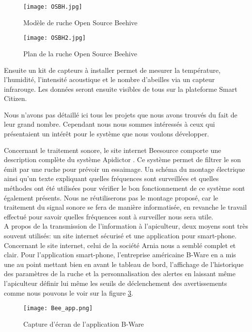 \begin{figure}[h]
\centering\texttt{[image: OSBH.jpg]}
\caption{\label{fig:OSBH} Modèle de ruche Open Source Beehive}
\end{figure}

\begin{figure}[h]
\centering\texttt{[image: OSBH2.jpg]}
\caption{\label{fig:OSBH2} Plan de la ruche Open Source Beehive}
\end{figure}

Ensuite un kit de capteurs à installer permet de mesurer la température, l'humidité, l'intensité acoustique et le nombre d'abeilles via un capteur infrarouge. Les données seront ensuite visibles de tous sur la plateforme Smart Citizen.

Nous n'avons pas détaillé ici tous les projets que nous avons trouvés du fait de leur grand nombre. Cependant nous nous sommes intéressés à ceux qui présentaient un intérêt pour le système que nous voulons développer. 

Concernant le traitement sonore, le site internet Beesource comporte une description complète du système Apidictor \cite{apidictor}. Ce système permet de filtrer le son émit par une ruche pour prévoir un essaimage. Un schéma du montage électrique ainsi qu'un texte expliquant quelles fréquences sont surveillées et quelles méthodes ont été utilisées pour vérifier le bon fonctionnement de ce système sont également présents. Nous ne réutiliserons pas le montage proposé, car le traitement du signal sonore se fera de manière informatisée, en revanche le travail effectué pour savoir quelles fréquences sont à surveiller nous sera utile. \\

A propos de la transmission de l'information à l'apiculteur, deux moyens sont très souvent utilisés: un site internet sécurisé et une application pour smart-phone. Concernant le site internet, celui de la société Arnia nous a semblé complet et clair. Pour l'application smart-phone, l'entreprise américaine B-Ware en a mis une au point mettant bien en avant le tableau de bord, l'affichage de l'historique des paramètres de la ruche et la personnalisation des alertes en laissant même l'apiculteur définir lui même les seuils de déclenchement des avertissements comme nous pouvons le voir sur la figure \ref{fig:application}.   

\begin{figure}[h]
\centering\texttt{[image: Bee\_app.png]}
\caption{\label{fig:application} Capture d'écran de l'application B-Ware}
\end{figure} 

